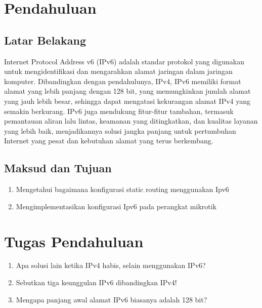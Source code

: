 \section{Pendahuluan}
\subsection{Latar Belakang}
Internet Protocol Address v6 (IPv6) adalah standar protokol yang digunakan untuk mengidentifikasi dan
mengarahkan alamat jaringan dalam jaringan komputer. Dibandingkan dengan pendahulunya, IPv4, IPv6
memiliki format alamat yang lebih panjang dengan 128 bit, yang memungkinkan jumlah alamat yang jauh
lebih besar, sehingga dapat mengatasi kekurangan alamat IPv4 yang semakin berkurang. IPv6 juga
mendukung fitur-fitur tambahan, termasuk pemantauan aliran lalu lintas, keamanan yang ditingkatkan, dan
kualitas layanan yang lebih baik, menjadikannya solusi jangka panjang untuk pertumbuhan Internet yang
pesat dan kebutuhan alamat yang terus berkembang.

\subsection{Maksud dan Tujuan}
\begin{center}
    \begin{enumerate}
        \item Mengetahui bagaimana konfigurasi static routing menggunakan Ipv6
        \item Mengimplementasikan konfigurasi Ipv6 pada perangkat mikrotik
    \end{enumerate}
\end{center}

\section{Tugas Pendahuluan}
\begin{center}
	\colorbox{cyan!30}{\parbox{0.8\linewidth}{
    \begin{enumerate}
        \item Apa solusi lain ketika IPv4 habis, selain menggunakan IPv6?
        \item Sebutkan tiga keunggulan IPv6 dibandingkan IPv4!
        \item Mengapa panjang awal alamat IPv6 biasanya adalah 128 bit?
    \end{enumerate}}}
\end{center}

